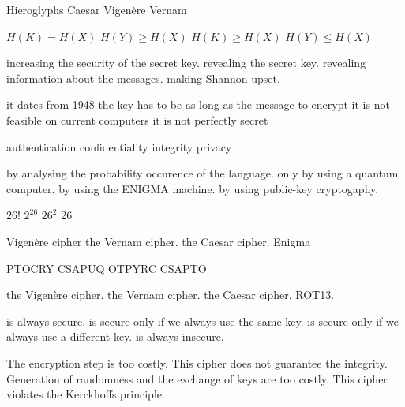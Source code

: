 {Hieroglyphs}
{Caesar}
{Vigen\`{e}re}
{Vernam}

{$H(K)=H(X)$}
{$H(Y)\geq H(X)$}
{$H(K)\geq H(X)$}
{$H(Y)\leq H(X)$}

 { increasing the security of the secret key.}
 { revealing the secret key.}
 { revealing information about the messages.}
 { making Shannon upset.}
 
 
 {it dates from 1948}
 {the key has to be as long as the message to encrypt}
 {it is not feasible on current computers}
 {it is not perfectly secret}
 
{authentication}%
{confidentiality}%
{integrity}%
{privacy}%

%
{by analysing the probability occurence of the language.}%
{only by using a quantum computer.}%
{by using the ENIGMA machine.}%
{by using public-key cryptogaphy.}%

%
{$26!$}%
{$2^{26}$}%
{$26^2$}%
{26}%

%
{Vigen\`ere cipher}%
{the Vernam cipher.}%
{the Caesar cipher.}%
{Enigma}%

%
{PTOCRY}%
{CSAPUQ}%
{OTPYRC}%
{CSAPTO}%

%
{the Vigen\`ere cipher.}%
{the Vernam cipher.}%
{the Caesar cipher.}%
{ROT13.}%

%
{is always secure.}%
{is secure only if we always use the same key.}%
{is secure only if we always use a different key.}%
{is always insecure.}%

%
{The encryption step is too costly.}%
{This cipher does not guarantee the integrity.}%
{Generation of randomness and the exchange of keys are too costly.}%
{This cipher violates the Kerckhoffs principle.}%

